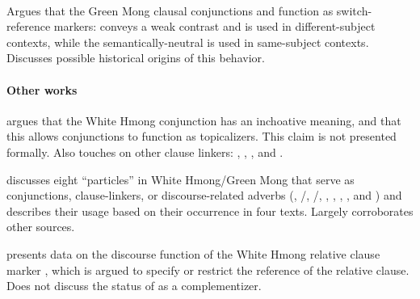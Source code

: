\documentclass[11pt,DIV=12]{scrartcl}
\newenvironment{commoncore}%
	{\hspace*{2.5em}\begin{minipage}{\dimexpr\linewidth-2.5em}%
		\KOMAoptions{parskip=half}%
		}
	{\end{minipage}}
\newenvironment{entry}[1]%
	{\paragraph{\citetitle{#1}}%
		\label{#1}%
		\parencite{#1}%
		\par\begin{commoncore}%
		}
	{\par\end{commoncore}}%
\newenvironment{otherworks}%
	{\paragraph{Other works}%
		\hphantom{:}%
		\par\begin{commoncore}}%
	{\par\end{commoncore}}%
\begin{document}
\begin{entry}{Li1989}
Argues that the Green Mong clausal conjunctions  and  function as switch-reference markers:  conveys a weak contrast and is used in different-subject contexts, while the semantically-neutral  is used in same-subject contexts. Discusses possible historical origins of this behavior.
\end{entry}

\begin{otherworks}
\citet{Clark1988,Clark1992} argues that the White Hmong conjunction  has an inchoative meaning, and that this allows conjunctions to function as topicalizers. This claim is not presented formally. Also touches on other clause linkers: , , , and .

\citet{Bleske2003} discusses eight ``particles'' in White Hmong/Green Mong that serve as conjunctions, clause-linkers, or discourse-related adverbs (, /, /, , , , , and ) and describes their usage based on their occurrence in four texts. Largely corroborates other sources.

\citet{Riddle1992,Riddle1993} presents data on the discourse function of the White Hmong relative clause marker , which is argued to specify or restrict the reference of the relative clause. Does not discuss the status of  as a complementizer.
\end{otherworks}




%
%

\end{document}
